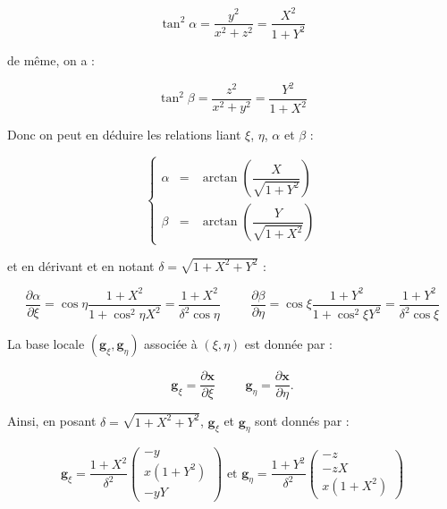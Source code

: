 \begin{equation}
\tan^2 \alpha = \dfrac{y^2}{x^2+z^2} = \dfrac{X^2}{1+Y^2}
\end{equation}

de même, on a :

\begin{equation}
\tan^2 \beta = \dfrac{z^2}{x^2+y^2} = \dfrac{Y^2}{1+X^2}
\end{equation}

Donc on peut en déduire les relations liant $\xi$, $\eta$, $\alpha$ et $\beta$ :

\begin{equation}
\left\lbrace
\begin{array}{rcl}
\alpha & = & \arctan \left( \dfrac{X}{\sqrt{1+Y^2}} \right)\\
\beta & = & \arctan \left( \dfrac{Y}{\sqrt{1+X^2}} \right)
\end{array}
\right.
\label{eq: alpha(xi) beta(eta)}
\end{equation}

et en dérivant et en notant $\delta=\sqrt{1+X^2+Y^2}$ :

\begin{equation}
\dfrac{\partial \alpha}{\partial \xi} = \cos \eta \dfrac{1+X^2}{1+\cos^2 \eta X^2} = \dfrac{1+X^2}{ \delta^2 \cos \eta}\hspace{1cm} \dfrac{\partial \beta}{\partial \eta} = \cos \xi \dfrac{1+Y^2}{1+\cos^2 \xi Y^2}= \dfrac{1+Y^2}{ \delta^2 \cos \xi }
\label{eq; der alpha beta}
\end{equation}

La base locale $(\mathbf{g}_{\xi}, \mathbf{g}_{\eta})$ associée à $(\xi,\eta)$ est donnée par :

$$\mathbf{g}_{\xi} = \dfrac{\partial \mathbf{x}}{\partial \xi} \hspace{1cm} \mathbf{g}_{\eta} = \dfrac{\partial \mathbf{x}}{\partial \eta}.$$

Ainsi, en posant $\delta = \sqrt{1+X^2+Y^2}$, $\mathbf{g}_{\xi}$ et $\mathbf{g}_{\eta}$ sont donnés par :

\begin{equation}
\mathbf{g}_{\xi} = \dfrac{1+X^2}{\delta^2} \begin{pmatrix}
-y \\ x(1+Y^2) \\ -yY
\end{pmatrix} \text{ et } \mathbf{g}_{\eta} = \dfrac{1+Y^2}{\delta^2} \begin{pmatrix}
-z \\ -zX \\ x(1+X^2)
\end{pmatrix}
\label{eq: base locale I}
\end{equation}


